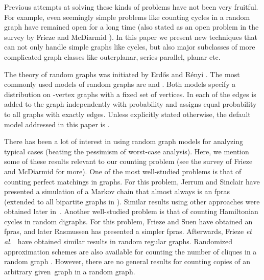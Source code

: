 \documentclass[11pt]{article}
\begin{document}
Previous attempts at solving these kinds of problems have not been very fruitful. For example, even seemingly simple problems like counting cycles in a random graph have remained open for a long time (also stated as an open problem in the survey by Frieze and McDiarmid \cite{fmc}).  In this paper we present new techniques that can not only handle simple graphs like cycles, but also major subclasses of more complicated graph classes like outerplanar, series-parallel, planar etc.

The theory of random graphs was initiated by Erd{\H{o}}s and R{\'e}nyi \cite{erdos}. The most commonly used models of random graphs are  and . Both models specify a distribution on -vertex graphs with a fixed set of vertices. In  each of the  edges is added to the graph independently with probability  and  assigns equal probability to all graphs with exactly  edges.  Unless explicitly stated otherwise, the default model addressed in this paper is . 

There has been a lot of interest in using random graph models for analyzing typical cases (beating the pessimism of worst-case analysis). Here, we mention some of these results relevant to our counting problem (see the survey of Frieze and McDiarmid \cite{fmc} for more). One of the most well-studied  problems is that of counting perfect matchings in graphs. For this problem, Jerrum and Sinclair \cite{jerrum1} have presented a simulation of a Markov chain that almost always is an fpras (extended to all bipartite graphs in \cite{jsv}). Similar results using other approaches were obtained later in~\cite{frieze,ras,chien,shiva1}. Another well-studied problem is that of counting Hamiltonian cycles in random digraphs. For this problem, Frieze and Suen \cite{suen} have obtained an fpras, and later Rasmussen \cite{ras} has presented a simpler fpras. Afterwards, Frieze \emph{et al.}\ \cite{fm} have obtained similar results in random regular graphs. Randomized approximation schemes are also available for counting the number of cliques in a random graph \cite{ras1}. However, there are no general results for counting copies of an arbitrary given~graph in a random graph. 
\end{document}
